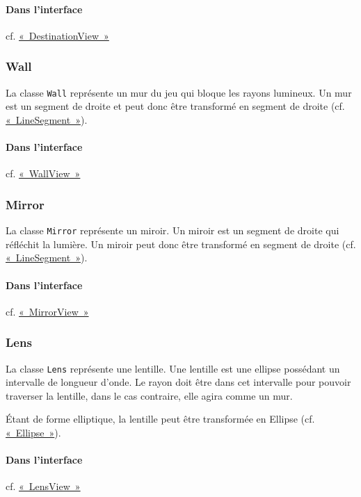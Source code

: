 \documentclass[]{report}
\begin{document}
\paragraph{Dans l'interface} cf. \hyperref[DestinationView]{«~DestinationView~»}

\subsubsection{\label{Wall}Wall}

La classe \texttt{Wall} représente un mur du jeu qui bloque les rayons
lumineux. Un mur est un segment de droite et peut donc être transformé 
en segment de droite (cf. \hyperref[LineSegment]{«~LineSegment~»}).

\paragraph{Dans l'interface} cf. \hyperref[WallView]{«~WallView~»}

\subsubsection{\label{Mirror}Mirror}

La classe \texttt{Mirror} représente un miroir. Un miroir
est un segment de droite qui réfléchit la lumière.
Un miroir peut donc être transformé en 
segment de droite (cf. \hyperref[LineSegment]{«~LineSegment~»}).

\paragraph{Dans l'interface} cf. \hyperref[MirrorView]{«~MirrorView~»}

\subsubsection{\label{Lens}Lens}

La classe \texttt{Lens} représente une lentille. Une lentille est
une ellipse possédant un intervalle de longueur d'onde. Le rayon doit
être dans cet intervalle pour pouvoir traverser la lentille, dans le cas
contraire, elle agira comme un mur.

Étant de forme elliptique, la lentille peut être transformée en Ellipse (cf. \hyperref[Ellipse]{«~Ellipse~»}).

\paragraph{Dans l'interface} cf. \hyperref[LensView]{«~LensView~»}
\end{document}
